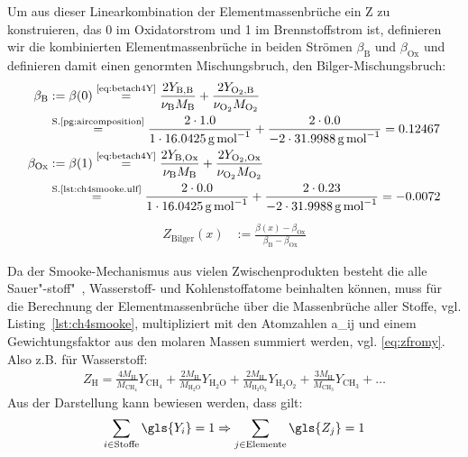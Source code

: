 Um aus dieser Linearkombination der Elementmassenbrüche ein \gls{Z} zu konstruieren, das 0 im Oxidatorstrom und 1 im Brennstoffstrom ist, definieren wir die kombinierten Elementmassenbrüche in beiden Strömen $\beta_\mathrm{B}$ und $\beta_\mathrm{Ox}$ und definieren damit einen genormten Mischungsbruch, den Bilger-Mischungsbruch:
\begin{align}
    \beta_\mathrm{B} & := \beta(0)
    \overset{\text{\autoref{eq:betach4Y}}}{=}
        \frac{ 2 Y_{\mathrm{B}  ,\mathrm{B}} }{ \nu_\mathrm{B}     M_\mathrm{B}     } +
        \frac{ 2 Y_{\mathrm{O}_2,\mathrm{B}} }{ \nu_{\mathrm{O}_2} M_{\mathrm{O}_2} }
    \\ &
    \overset{\text{S.\pageref{pg:aircomposition}}}{=}
       \frac{ 2 \cdot 1.0 }{ 1 \cdot \SI{16.0425}{\gram\per\mole} } +
       \frac{ 2 \cdot 0.0 }{-2 \cdot \SI{31.9988}{\gram\per\mole} }
    = 0.12467
    \\
    \beta_\mathrm{Ox} & := \beta(1)
    \overset{\text{\autoref{eq:betach4Y}}}{=}
        \frac{ 2 Y_{\mathrm{B}  ,\mathrm{Ox}} }{ \nu_\mathrm{B}     M_\mathrm{B}     } +
        \frac{ 2 Y_{\mathrm{O}_2,\mathrm{Ox}} }{ \nu_{\mathrm{O}_2} M_{\mathrm{O}_2} }
    \\ &
    \overset{\text{S.\ref{lst:ch4smooke.ulf}}}{=}
        \frac{ 2 \cdot 0.0 }{ 1 \cdot \SI{16.0425}{\gram\per\mole} } +
        \frac{ 2 \cdot 0.23}{-2 \cdot \SI{31.9988}{\gram\per\mole} }
    = -0.0072
\end{align}
\begin{align}
    \label{eq:ZBilger}
    Z_\mathrm{Bilger}(x) & :=
        \frac{ \beta(x) - \beta_\mathrm{Ox} }{ \beta_\mathrm{B} - \beta_\mathrm{Ox} }
\end{align}

Da der Smooke-Mechanismus aus vielen Zwischenprodukten besteht die alle Sauer"-stoff"~, Wasserstoff- und Kohlenstoffatome beinhalten können, muss für die Berechnung der Elementmassenbrüche über die Massenbrüche aller Stoffe, vgl. Listing~\ref{lst:ch4smooke}, multipliziert mit den Atomzahlen \gls{a_ij} und einem Gewichtungsfaktor aus den molaren Massen summiert werden, vgl. \autoref{eq:zfromy}. Also z.B. für Wasserstoff:
\begin{align}
    Z_\mathrm{H} =
        \frac{ 4 M_\mathrm{H} }{ M_{\mathrm{CH}_4} } Y_{\mathrm{CH}_4} +
        \frac{ 2 M_\mathrm{H} }{ M_{\mathrm{H}_2\mathrm{O}} } Y_{\mathrm{H}_2\mathrm{O}} +
        \frac{ 2 M_\mathrm{H} }{ M_{\mathrm{H}_2\mathrm{O}_2} } Y_{\mathrm{H}_2\mathrm{O}_2} +
        \frac{ 3 M_\mathrm{H} }{ M_{\mathrm{CH}_3} } Y_{\mathrm{CH}_3} +
        \ldots
\end{align}
Aus der Darstellung kann bewiesen werden, dass gilt:
\begin{align}
    \sum\limits_{i \in \text{Stoffe} } \gls{Y_i} = 1
    \Rightarrow
    \sum\limits_{j \in \text{Elemente}} \gls{Z_j} = 1
\end{align}

